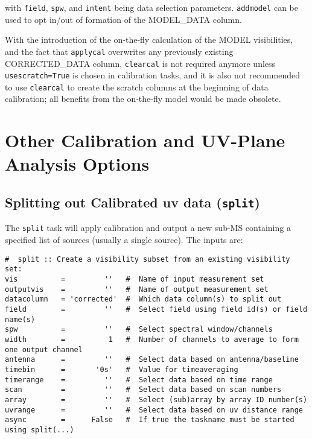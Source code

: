 with {\tt field}, {\tt spw}, and {\tt intent} being data selection
parameters. {\tt addmodel} can be used to opt in/out of formation
of the MODEL\_DATA column.


With the introduction of the on-the-fly calculation of the
MODEL visibilities, and the fact that {\tt applycal} overwrites any
previously existing CORRECTED\_DATA column, {\tt clearcal} is not
required anymore unless {\tt usescratch=True} is chosen in calibration
tasks, and it is also not recommended to use {\tt clearcal} to create
the scratch columns at the beginning of data calibration; all benefits
from the on-the-fly model would be made obsolete.

\section{Other Calibration and UV-Plane Analysis Options}
\label{section:cal.other}

\subsection{Splitting out Calibrated uv data ({\tt split})}
\label{section:cal.other.split}

The {\tt split} task will apply calibration and output a new sub-MS
containing a specified list of sources (usually a single source).
The inputs are:
\small
\begin{verbatim}
#  split :: Create a visibility subset from an existing visibility set:
vis          =         ''   #  Name of input measurement set
outputvis    =         ''   #  Name of output measurement set
datacolumn   = 'corrected'  #  Which data column(s) to split out
field        =         ''   #  Select field using field id(s) or field name(s)
spw          =         ''   #  Select spectral window/channels
width        =          1   #  Number of channels to average to form one output channel
antenna      =         ''   #  Select data based on antenna/baseline
timebin      =       '0s'   #  Value for timeaveraging
timerange    =         ''   #  Select data based on time range
scan         =         ''   #  Select data based on scan numbers
array        =         ''   #  Select (sub)array by array ID number(s)
uvrange      =         ''   #  Select data based on uv distance range
async        =      False   #  If true the taskname must be started using split(...)
\end{verbatim}
\normalsize

